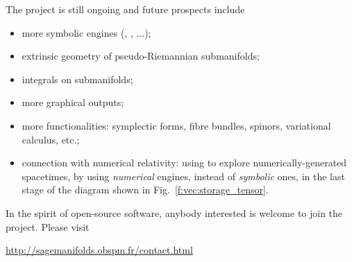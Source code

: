 The  project is still ongoing and future prospects include
\begin{itemize}
\item more symbolic engines (, , ...);
\item extrinsic geometry of pseudo-Riemannian submanifolds;
\item integrals on submanifolds;
\item more graphical outputs;
\item more functionalities: symplectic forms, fibre bundles,
spinors, variational calculus, etc.;
\item connection with numerical relativity: using \Sage{} to explore
numerically-generated spacetimes, by using \emph{numerical} engines, instead
of \emph{symbolic} ones, in the last stage of the diagram
shown in Fig.~\ref{f:vec:storage_tensor}.
\end{itemize}
In the spirit of open-source software, anybody interested is welcome
to join the project. Please visit
\begin{center}
\url{http://sagemanifolds.obspm.fr/contact.html}
\end{center}

